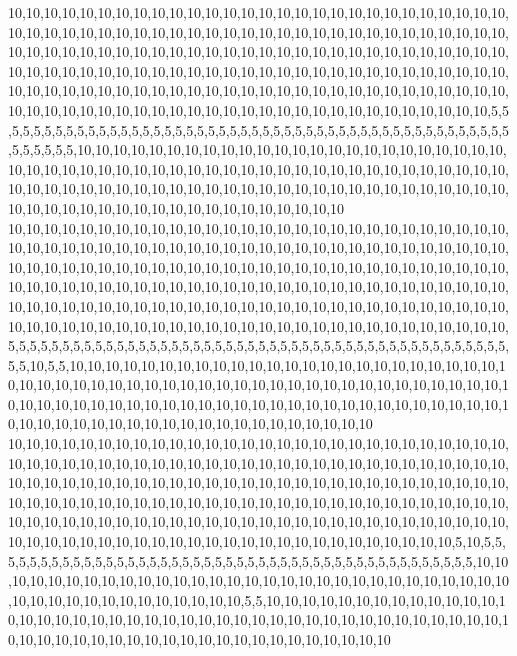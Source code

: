 10,10,10,10,10,10,10,10,10,10,10,10,10,10,10,10,10,10,10,10,10,10,10,10,10,10,10,10,10,10,10,10,10,10,10,10,10,10,10,10,10,10,10,10,10,10,10,10,10,10,10,10,10,10,10,10,10,10,10,10,10,10,10,10,10,10,10,10,10,10,10,10,10,10,10,10,10,10,10,10,10,10,10,10,10,10,10,10,10,10,10,10,10,10,10,10,10,10,10,10,10,10,10,10,10,10,10,10,10,10,10,10,10,10,10,10,10,10,10,10,10,10,10,10,10,10,10,10,10,10,10,10,10,10,10,10,10,10,10,10,10,10,10,10,10,10,10,10,10,10,10,10,10,10,10,10,10,10,10,10,10,10,10,10,10,10,10,5,5,5,5,5,5,5,5,5,5,5,5,5,5,5,5,5,5,5,5,5,5,5,5,5,5,5,5,5,5,5,5,5,5,5,5,5,5,5,5,5,5,5,5,5,5,5,5,5,5,5,5,5,5,10,10,10,10,10,10,10,10,10,10,10,10,10,10,10,10,10,10,10,10,10,10,10,10,10,10,10,10,10,10,10,10,10,10,10,10,10,10,10,10,10,10,10,10,10,10,10,10,10,10,10,10,10,10,10,10,10,10,10,10,10,10,10,10,10,10,10,10,10,10,10,10,10,10,10,10,10,10,10,10,10,10,10,10,10,10,10,10,10,10,10,10,10,10,10,10,10,10,10
10,10,10,10,10,10,10,10,10,10,10,10,10,10,10,10,10,10,10,10,10,10,10,10,10,10,10,10,10,10,10,10,10,10,10,10,10,10,10,10,10,10,10,10,10,10,10,10,10,10,10,10,10,10,10,10,10,10,10,10,10,10,10,10,10,10,10,10,10,10,10,10,10,10,10,10,10,10,10,10,10,10,10,10,10,10,10,10,10,10,10,10,10,10,10,10,10,10,10,10,10,10,10,10,10,10,10,10,10,10,10,10,10,10,10,10,10,10,10,10,10,10,10,10,10,10,10,10,10,10,10,10,10,10,10,10,10,10,10,10,10,10,10,10,10,10,10,10,10,10,10,10,10,10,10,10,10,10,10,10,10,10,10,10,10,10,10,10,5,5,5,5,5,5,5,5,5,5,5,5,5,5,5,5,5,5,5,5,5,5,5,5,5,5,5,5,5,5,5,5,5,5,5,5,5,5,5,5,5,5,5,5,5,5,5,5,10,5,5,10,10,10,10,10,10,10,10,10,10,10,10,10,10,10,10,10,10,10,10,10,10,10,10,10,10,10,10,10,10,10,10,10,10,10,10,10,10,10,10,10,10,10,10,10,10,10,10,10,10,10,10,10,10,10,10,10,10,10,10,10,10,10,10,10,10,10,10,10,10,10,10,10,10,10,10,10,10,10,10,10,10,10,10,10,10,10,10,10,10,10,10,10,10,10,10,10,10,10,10,10
10,10,10,10,10,10,10,10,10,10,10,10,10,10,10,10,10,10,10,10,10,10,10,10,10,10,10,10,10,10,10,10,10,10,10,10,10,10,10,10,10,10,10,10,10,10,10,10,10,10,10,10,10,10,10,10,10,10,10,10,10,10,10,10,10,10,10,10,10,10,10,10,10,10,10,10,10,10,10,10,10,10,10,10,10,10,10,10,10,10,10,10,10,10,10,10,10,10,10,10,10,10,10,10,10,10,10,10,10,10,10,10,10,10,10,10,10,10,10,10,10,10,10,10,10,10,10,10,10,10,10,10,10,10,10,10,10,10,10,10,10,10,10,10,10,10,10,10,10,10,10,10,10,10,10,10,10,10,10,10,10,10,10,10,10,5,10,5,5,5,5,5,5,5,5,5,5,5,5,5,5,5,5,5,5,5,5,5,5,5,5,5,5,5,5,5,5,5,5,5,5,5,5,5,5,5,5,5,5,5,5,5,10,10,10,10,10,10,10,10,10,10,10,10,10,10,10,10,10,10,10,10,10,10,10,10,10,10,10,10,10,10,10,10,10,10,10,10,10,10,10,10,10,10,10,5,5,10,10,10,10,10,10,10,10,10,10,10,10,10,10,10,10,10,10,10,10,10,10,10,10,10,10,10,10,10,10,10,10,10,10,10,10,10,10,10,10,10,10,10,10,10,10,10,10,10,10,10,10,10,10,10,10,10,10,10,10,10,10,10

